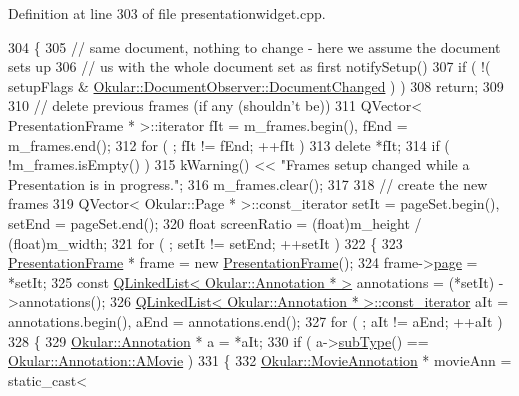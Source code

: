 Definition at line 303 of file presentationwidget.\+cpp.


\begin{DoxyCode}
304 \{
305     \textcolor{comment}{// same document, nothing to change - here we assume the document sets up}
306     \textcolor{comment}{// us with the whole document set as first notifySetup()}
307     \textcolor{keywordflow}{if} ( !( setupFlags & \hyperlink{classOkular_1_1DocumentObserver_aba00584af99894f95a9650e91f109d40ae599564392c01b22e96eff7602c4dd03}{Okular::DocumentObserver::DocumentChanged}
       ) )
308         \textcolor{keywordflow}{return};
309 
310     \textcolor{comment}{// delete previous frames (if any (shouldn't be))}
311     QVector< PresentationFrame * >::iterator fIt = m\_frames.begin(), fEnd = m\_frames.end();
312     \textcolor{keywordflow}{for} ( ; fIt != fEnd; ++fIt )
313         \textcolor{keyword}{delete} *fIt;
314     \textcolor{keywordflow}{if} ( !m\_frames.isEmpty() )
315         kWarning() << \textcolor{stringliteral}{"Frames setup changed while a Presentation is in progress."};
316     m\_frames.clear();
317 
318     \textcolor{comment}{// create the new frames}
319     QVector< Okular::Page * >::const\_iterator setIt = pageSet.begin(), setEnd = pageSet.end();
320     \textcolor{keywordtype}{float} screenRatio = (float)m\_height / (\textcolor{keywordtype}{float})m\_width;
321     \textcolor{keywordflow}{for} ( ; setIt != setEnd; ++setIt )
322     \{
323         \hyperlink{structPresentationFrame}{PresentationFrame} * frame = \textcolor{keyword}{new} \hyperlink{structPresentationFrame}{PresentationFrame}();
324         frame->\hyperlink{structPresentationFrame_ab40e6871a08519f4f2c97d3f1009f2a5}{page} = *setIt;
325         \textcolor{keyword}{const} \hyperlink{classQLinkedList}{QLinkedList< Okular::Annotation * >} annotations = (*setIt)
      ->annotations();
326         \hyperlink{classQLinkedList}{QLinkedList< Okular::Annotation * >::const\_iterator}
       aIt = annotations.begin(), aEnd = annotations.end();
327         \textcolor{keywordflow}{for} ( ; aIt != aEnd; ++aIt )
328         \{
329             \hyperlink{classOkular_1_1Annotation}{Okular::Annotation} * a = *aIt;
330             \textcolor{keywordflow}{if} ( a->\hyperlink{classOkular_1_1Annotation_af9833449767eacd740f377e69a1fdd48}{subType}() == \hyperlink{classOkular_1_1Annotation_af71b46e37d5f850b97d5c4de3be9aac0a711a9d706a86b55f0799e944fb2750e6}{Okular::Annotation::AMovie} )
331             \{
332                 \hyperlink{classOkular_1_1MovieAnnotation}{Okular::MovieAnnotation} * movieAnn = \textcolor{keyword}{static\_cast<} 

\end{DoxyCode}
